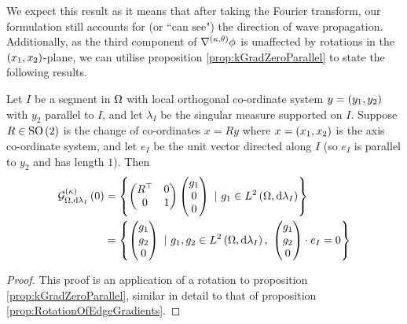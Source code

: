 We expect this result as it means that after taking the Fourier transform, our formulation still accounts for (or ``can see") the direction of wave propagation.
Additionally, as the third component of $\nabla^{\left( \kappa, \theta \right)}\phi$ is unaffected by rotations in the $\left( x_1,x_2 \right)$-plane, we can utilise proposition \ref{prop:kGradZeroParallel} to state the following results.
\begin{cory} \label{cory:kGradZeroArbitraryAngle}
	Let $I$ be a segment in $\Omega$ with local orthogonal co-ordinate system $y=\left( y_1,y_2 \right)$ with $y_2$ parallel to $I$, and let $\lambda_I$ be the singular measure supported on $I$.
	Suppose $R\in\mathrm{SO}\left( 2 \right)$ is the change of co-ordinates $x=Ry$ where $x=\left( x_1,x_2 \right)$ is the axis co-ordinate system, and let $e_I$ be the unit vector directed along $I$ (so $e_I$ is parallel to $y_2$ and has length $1$).
	Then
	\begin{align*}
		\kgradZero{\ddom}{\lambda_I} &= \clbracs{ 
		\begin{pmatrix} R^{\top} & 0 \\ 0 & 1 \end{pmatrix}\begin{pmatrix} g_1 \\ 0 \\ 0 \end{pmatrix}				\ \vert \ g_1\in\ltwo{\ddom}{\lambda_I}
		} \\
		&= \clbracs{ 
		\begin{pmatrix} g_1 \\ g_2 \\ 0 \end{pmatrix} 
		\ \vert \ g_1,g_2\in\ltwo{\ddom}{\lambda_I}, \ \begin{pmatrix} g_1 \\ g_2 \\ 0 \end{pmatrix} \cdot e_I = 0
		}
	\end{align*}
\end{cory}
\begin{proof}
	This proof is an application of a rotation to proposition \ref{prop:kGradZeroParallel}, similar in detail to that of proposition \ref{prop:RotationOfEdgeGradients}.
\end{proof}

